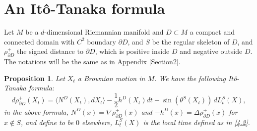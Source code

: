 \documentclass[JEP,XML,SOM,Unicode,NoFloatCountersInSection,published]{cedram}
\theoremstyle{plain}
\newtheorem{prop}[thm]{Proposition}
\theoremstyle{definition}
\let\D\Delta
\let\n\nabla
\begin{document}
\section{An Itô-Tanaka formula}\label{AppendixF}

Let $M$ be a $d$-dimensional Riemannian manifold
{and} $D\subset M$ a {compact and} connected domain with $C^2$ boundary $\partial D$, and $S$ be the regular skeleton of $D$, and $ \rho^{+}_{\partial D}$ the signed distance to $\partial D$, which is positive inside $D$ and negative outside $D$. The notations will be the same as in Appendix \ref{Section2}.

\begin{prop}\label{PropF1}
Let $X_t$ a Brownian motion in $M$. We have the following Itô-Tanaka formula:
\[
d \rho^{+}_{\partial D} (X_t) = \langle N^D(X_t), dX_t \rangle -\frac{1}{2} h^D(X_t) dt - \sin\left(\theta^{S}(X_t)\right)\,dL_t^{S}(X),
\]
in the above formula, $N^D(x) = \n \rho^{+}_{\partial D} (x) $ and
$ - h^D(x) = \D \rho^{+}_{\partial D} (x)$ for $x \notin S $, and define to be $ 0$ elsewhere, $L_t^S(X)$ is the local time defined as in \eqref{4.2}.
\end{prop}
\end{document}
